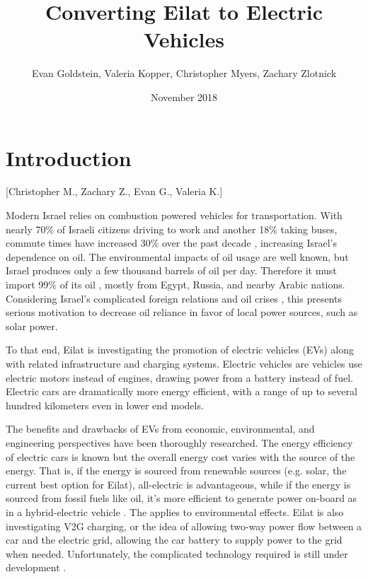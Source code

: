 \documentclass[12pt]{article}                         %
\title{Converting Eilat to Electric Vehicles}
\author{Evan Goldstein, Valeria Kopper, Christopher Myers, Zachary Zlotnick}
\date{November 2018}
\begin{document}
\maketitle
\newpage

\renewcommand\abstractname{Summary} %

\tableofcontents
\newpage
\listofauthorships
\newpage
{}
\doublespacing

\section{Introduction}[Christopher M., Zachary Z., Evan G., Valeria K.]

Modern Israel relies on combustion powered vehicles for transportation. With nearly 70\% of Israeli citizens driving to work and another 18\% taking buses, commute times have increased 30\% over the past decade \cite{Dori2018IsraeliRoads}, increasing Israel's dependence on oil. The environmental impacts of oil usage are well known, but Israel produces only a few thousand barrels of oil per day. Therefore it must import 99\% of its oil \cite{Engber2006WhereOil}, mostly from Egypt, Russia, and nearby Arabic nations. Considering Israel's complicated foreign relations and oil crises \cite{Engber2006WhereOil}, this presents serious motivation to decrease oil reliance in favor of local power sources, such as solar power.

To that end, Eilat is investigating the promotion of electric vehicles (EVs) along with related infrastructure and charging systems. Electric vehicles are vehicles use electric motors instead of engines, drawing power from a battery instead of fuel. Electric cars are dramatically more energy efficient, with a range of up to several hundred kilometers \cite{Friel2010ManagementVehicles} even in lower end models.

The benefits and drawbacks of EVs from economic, environmental, and engineering perspectives have been thoroughly researched. The energy efficiency of electric cars is known but the overall energy cost varies with the source of the energy. That is, if the energy is sourced from renewable sources (e.g. solar, the current best option for Eilat), all-electric is advantageous, while if the energy is sourced from fossil fuels like oil, it's more efficient to generate power on-board as in a hybrid-electric vehicle \cite{Dincer2010EconomicOptions}. The applies to environmental effects. Eilat is also investigating V2G charging, or the idea of allowing two-way power flow between a car and the electric grid, allowing the car battery to supply power to the grid when needed. Unfortunately, the complicated technology required is still under development \cite{2018Nuvve...}.
\end{document}
